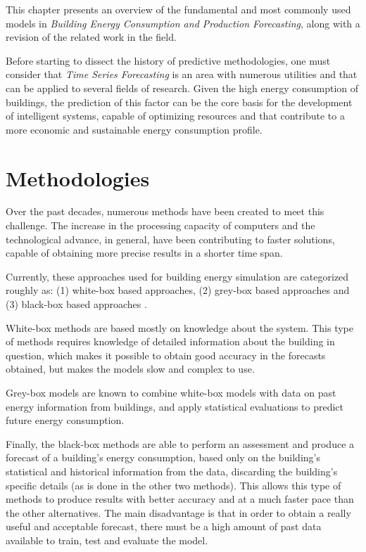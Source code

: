\cleardoublepage
\label{chap:background}

This chapter presents an overview of the fundamental and most commonly used models in \textit{Building Energy Consumption and Production Forecasting}, along with a revision of the related work in the field.

Before starting to dissect the history of predictive methodologies, one must consider that \textit{Time Series Forecasting} is an area with numerous utilities and that can be applied to several fields of research. Given the high energy consumption of buildings, the prediction of this factor can be the core basis for the development of intelligent systems, capable of optimizing resources and that contribute to a more economic and sustainable energy consumption profile.


\section{Methodologies\label{a}}

Over the past decades, numerous methods have been created to meet this challenge. The increase in the processing capacity of computers and the technological advance, in general, have been contributing to faster solutions, capable of obtaining more precise results in a shorter time span.

Currently, these approaches used for building energy simulation are categorized roughly as: (1) white-box based approaches, (2) grey-box based approaches and (3) black-box based approaches \cite{review2017}. 

White-box methods are based mostly on knowledge about the system. This type of methods requires knowledge of detailed information about the building in question, which makes it possible to obtain good accuracy in the forecasts obtained, but makes the models slow and complex to use.

Grey-box models are known to combine white-box models with data on past energy information from buildings, and apply statistical evaluations to predict future energy consumption.

Finally, the black-box methods are able to perform an assessment and produce a forecast of a building's energy consumption, based only on the building's statistical and historical information from the data, discarding the building's specific details (as is done in the other two methods). This allows this type of methods to produce results with better accuracy and at a much faster pace than the other alternatives. The main disadvantage is that in order to obtain a really useful and acceptable forecast, there must be a high amount of past data available to train, test and evaluate the model.

